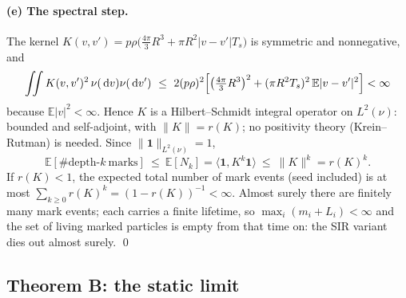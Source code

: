 \documentclass[11pt]{article}
\newcommand{\dd}{\,\mathrm{d}}
\newcommand{\E}{\mathbb{E}}
\newcommand{\Ts}{T_s}
\begin{document}
\paragraph{(e) The spectral step.}
The kernel $K(v,v')=p\rho\bigl(\frac{4\pi}{3}R^3+\pi R^2|v-v'|\Ts\bigr)$ is
symmetric and nonnegative, and
\[
  \iint K(v,v')^2\,\nu(\dd v)\nu(\dd v')\ \le\
  2(p\rho)^2\Bigl[\bigl(\tfrac{4\pi}{3}R^3\bigr)^2
  +(\pi R^2\Ts)^2\,\E|v-v'|^2\Bigr]<\infty
\]
because $\E|v|^2<\infty$. Hence $K$ is a Hilbert--Schmidt integral operator
on $L^2(\nu)$: bounded and self-adjoint, with $\|K\|=r(K)$; no positivity
theory (Krein--Rutman) is needed. Since $\|\mathbf 1\|_{L^2(\nu)}=1$,
\[
  \E[\#\text{depth-}k\ \text{marks}]\ \le\ \E[N_k]
  =\langle\mathbf 1,K^k\mathbf 1\rangle\ \le\ \|K\|^k=r(K)^k .
\]
If $r(K)<1$, the expected total number of mark events (seed included) is at
most $\sum_{k\ge0}r(K)^k=(1-r(K))^{-1}<\infty$. Almost surely there are
finitely many mark events; each carries a finite lifetime, so
$\max_i(m_i+L_i)<\infty$ and the set of living marked particles is empty
from that time on: the SIR variant dies out almost surely. \qed

\subsection{Theorem B: the static limit}\label{app:thmB}
\end{document}
